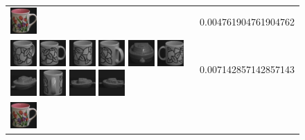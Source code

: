 {\begin{figure}[p]
\begin{tabular}{m{11cm} | m{3cm} |}
\includegraphics[width=1cm]{coil/beeld-6.eps}
& {\scriptsize 0.004761904761904762}
\\
\includegraphics[width=1cm]{coil/beeld-51.eps}
\includegraphics[width=1cm]{coil/beeld-48.eps}
\includegraphics[width=1cm]{coil/beeld-50.eps}
\includegraphics[width=1cm]{coil/beeld-52.eps}
\includegraphics[width=1cm]{coil/beeld-26.eps}
\includegraphics[width=1cm]{coil/beeld-49.eps}
\includegraphics[width=1cm]{coil/beeld-27.eps}
\includegraphics[width=1cm]{coil/beeld-53.eps}
\includegraphics[width=1cm]{coil/beeld-25.eps}
\includegraphics[width=1cm]{coil/beeld-24.eps}
& {\scriptsize 0.007142857142857143}
\\
\includegraphics[width=1cm]{coil/beeld-6.eps}

\end{tabular}
\end{figure}}
